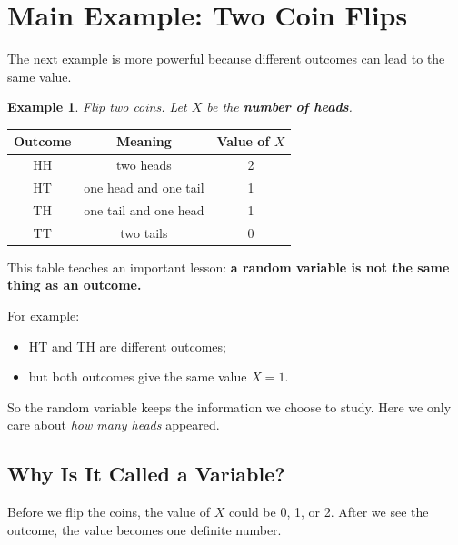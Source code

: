 \documentclass[11pt,a4paper]{article}
\newtheorem{example}[definition]{Example}
\begin{document}
\section{Main Example: Two Coin Flips}

The next example is more powerful because different outcomes can lead to the same value.

\begin{example}
Flip two coins.
Let \(X\) be the \textbf{number of heads}.
\end{example}

\begin{center}
\begin{tabular}{c c c}
\toprule
Outcome & Meaning & Value of \(X\) \\
\midrule
HH & two heads & 2 \\
HT & one head and one tail & 1 \\
TH & one tail and one head & 1 \\
TT & two tails & 0 \\
\bottomrule
\end{tabular}
\end{center}

This table teaches an important lesson:
\textbf{a random variable is not the same thing as an outcome.}

For example:

\begin{itemize}
  \item HT and TH are different outcomes;
  \item but both outcomes give the same value \(X=1\).
\end{itemize}

So the random variable keeps the information we choose to study.
Here we only care about \emph{how many heads} appeared.

\subsection*{Why Is It Called a Variable?}

Before we flip the coins, the value of \(X\) could be 0, 1, or 2.
After we see the outcome, the value becomes one definite number.

\begin{center}
\end{center}
\end{document}
